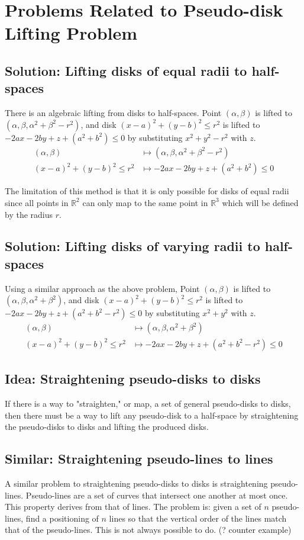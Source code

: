 \documentclass{NSF}
\begin{document}
\section{Problems Related to Pseudo-disk Lifting Problem}
\subsection{Solution: Lifting disks of equal radii to half-spaces}
There is an algebraic lifting from disks to half-spaces. Point $(\alpha,\beta)$ is lifted to $(\alpha,\beta,\alpha^2+\beta^2-r^2)$, and disk $(x-a)^2+(y-b)^2\leq r^2$ is lifted to $-2ax -2by + z + (a^2+b^2) \leq 0$ by substituting  $x^2+y^2-r^2$ with $z$. 
\begin{align*}
(\alpha,\beta) & \mapsto (\alpha,\beta,\alpha^2+\beta^2-r^2) \\
(x-a)^2+(y-b)^2\leq r^2 & \mapsto -2ax -2by + z + (a^2+b^2) \leq 0
\end{align*}

The limitation of this method is that it is only possible for disks of equal radii since all points in $\mathbb{R}^2$ can only map to the same point in $\mathbb{R}^3$ which will be defined by the radius $r$.

\subsection{Solution: Lifting disks of varying radii to half-spaces}
Using a similar approach as the above problem, Point $(\alpha,\beta)$ is lifted to $(\alpha,\beta,\alpha^2+\beta^2)$, and disk $(x-a)^2+(y-b)^2\leq r^2$ is lifted to $-2ax -2by + z + (a^2+b^2-r^2) \leq 0$ by substituting  $x^2+y^2$ with $z$. 
\begin{align*}
(\alpha,\beta) & \mapsto (\alpha,\beta,\alpha^2+\beta^2) \\
(x-a)^2+(y-b)^2\leq r^2 & \mapsto -2ax -2by + z + (a^2+b^2-r^2) \leq 0
\end{align*}

\subsection{Idea: Straightening pseudo-disks to disks}
If there is a way to "straighten," or map, a set of general pseudo-disks to disks, then there must be a way to lift any pseudo-disk to a half-space by straightening the pseudo-disks to disks and lifting the produced disks.

\subsection{Similar: Straightening pseudo-lines to lines}
A similar problem to straightening pseudo-disks to disks is straightening pseudo-lines. Pseudo-lines are a set of curves that intersect one another at most once. This property derives from that of lines. The problem is:  given a set of $n$ pseudo-lines, find a positioning of $n$ lines so that the vertical order of the lines match that of the pseudo-lines. This is not always possible to do. (? counter example)
\end{document}
